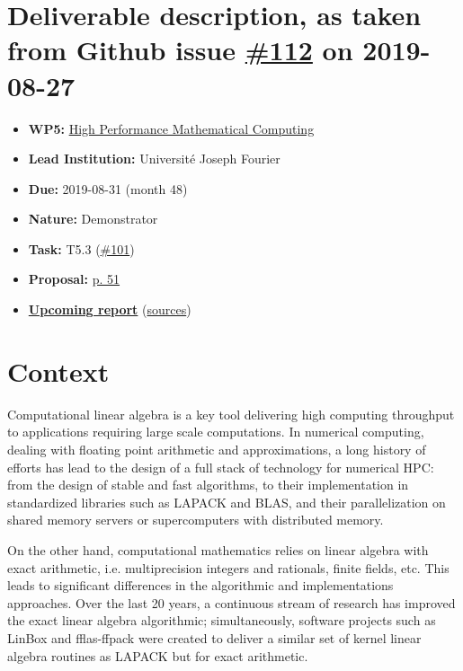 \hypertarget{deliverable-description-as-taken-from-github-issue-112-on-2019-08-27}{%
\section*{\texorpdfstring{Deliverable description, as taken from Github
issue
\href{https://github.com/OpenDreamKit/OpenDreamKit/issues/112}{\#112} on
2019-08-27}{Deliverable description, as taken from Github issue \#112 on 2019-08-27}}\label{deliverable-description-as-taken-from-github-issue-112-on-2019-08-27}}

\begin{itemize}
\tightlist
\item
  \textbf{WP5:}
  \href{https://github.com/OpenDreamKit/OpenDreamKit/tree/master/WP5}{High
  Performance Mathematical Computing}
\item
  \textbf{Lead Institution:} Université Joseph Fourier
\item
  \textbf{Due:} 2019-08-31 (month 48)
\item
  \textbf{Nature:} Demonstrator
\item
  \textbf{Task:} T5.3
  (\href{https://github.com/OpenDreamKit/OpenDreamKit/issues/101}{\#101})
\item
  \textbf{Proposal:}
  \href{https://github.com/OpenDreamKit/OpenDreamKit/raw/master/Proposal/proposal-www.pdf}{p.
  51}
\item
  \textbf{\href{https://github.com/OpenDreamKit/OpenDreamKit/raw/master/WP5/D5.14/report-final.pdf}{Upcoming
  report}}
  (\href{https://github.com/OpenDreamKit/OpenDreamKit/raw/master/WP5/D5.14/}{sources})
\end{itemize}

\hypertarget{context}{%
\section*{Context}\label{context}}

Computational linear algebra is a key tool delivering high computing
throughput to applications requiring large scale computations. In
numerical computing, dealing with floating point arithmetic and
approximations, a long history of efforts has lead to the design of a
full stack of technology for numerical HPC: from the design of stable
and fast algorithms, to their implementation in standardized libraries
such as LAPACK and BLAS, and their parallelization on shared memory
servers or supercomputers with distributed memory.

On the other hand, computational mathematics relies on linear algebra
with exact arithmetic, i.e. multiprecision integers and rationals,
finite fields, etc. This leads to significant differences in the
algorithmic and implementations approaches. Over the last 20 years, a
continuous stream of research has improved the exact linear algebra
algorithmic; simultaneously, software projects such as LinBox and
fflas-ffpack were created to deliver a similar set of kernel linear
algebra routines as LAPACK but for exact arithmetic.

